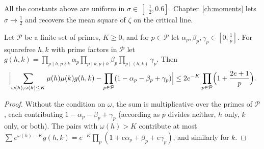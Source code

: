 All the constants above are uniform in $\sigma\in\left]\frac12,0.6\right]$. Chapter~\ref{ch:moments} lets $\sigma\to\frac12$ and recovers the mean square of $\zeta$ on the critical line.

\begin{lemma}\label{lem:rankinquad}
Let $\mathcal P$ be a finite set of primes, $K\ge0$, and for $p\in\mathcal P$ let $\alpha_p,\beta_p,\gamma_p\in[0,\frac1p]$. For squarefree $h,k$ with prime factors in $\mathcal P$ let $g(h,k)=\prod_{p\mid h,p\nmid k}\alpha_p\prod_{p\mid k,p\nmid h}\beta_p\prod_{p\mid(h,k)}\gamma_p$. Then
\[
\Bigl|\sum_{\omega(h),\omega(k)\le K}\mu(h)\mu(k)g(h,k)-\prod_{p\in\mathcal P}(1-\alpha_p-\beta_p+\gamma_p)\Bigr|\le2e^{-K}\prod_{p\in\mathcal P}\Bigl(1+\frac{2e+1}p\Bigr).
\]
\end{lemma}
\begin{proof}
Without the condition on $\omega$, the sum is multiplicative over the primes of $\mathcal P$, each contributing $1-\alpha_p-\beta_p+\gamma_p$ (according as $p$ divides neither, $h$ only, $k$ only, or both). The pairs with $\omega(h)>K$ contribute at most $\sum e^{\omega(h)-K}g(h,k)=e^{-K}\prod_p(1+e\alpha_p+\beta_p+e\gamma_p)$, and similarly for $k$.
\end{proof}

